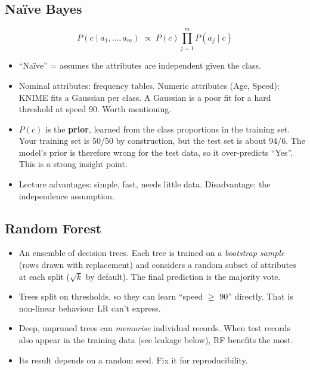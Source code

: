 \documentclass[11pt,a4paper]{article}
\begin{document}
\subsection{Naïve Bayes}
\[
P(c \mid a_1,\dots,a_m) \;\propto\; P(c)\prod_{j=1}^{m} P(a_j \mid c)
\]
\begin{itemize}
  \item ``Naïve'' = assumes the attributes are independent given the class.
  \item Nominal attributes: frequency tables. Numeric attributes (Age, Speed): KNIME fits a Gaussian per class.
        A Gaussian is a poor fit for a hard threshold at speed 90. Worth mentioning.
  \item $P(c)$ is the \textbf{prior}, learned from the class proportions in the training set. Your training
        set is 50/50 by construction, but the test set is about 94/6. The model's prior is therefore wrong
        for the test data, so it over-predicts ``Yes''. This is a strong insight point.
  \item Lecture advantages: simple, fast, needs little data. Disadvantage: the independence assumption.
\end{itemize}

\subsection{Random Forest}
\begin{itemize}
  \item An ensemble of decision trees. Each tree is trained on a \emph{bootstrap sample} (rows drawn
        with replacement) and considers a random subset of attributes at each split ($\sqrt{k}$ by default).
        The final prediction is the majority vote.
  \item Trees split on thresholds, so they can learn ``speed $\geq$ 90'' directly. That is
        non-linear behaviour LR can't express.
  \item Deep, unpruned trees can \emph{memorise} individual records. When test records also appear in the
        training data (see leakage below), RF benefits the most.
  \item Its result depends on a random seed. Fix it for reproducibility.
\end{itemize}
\end{document}
